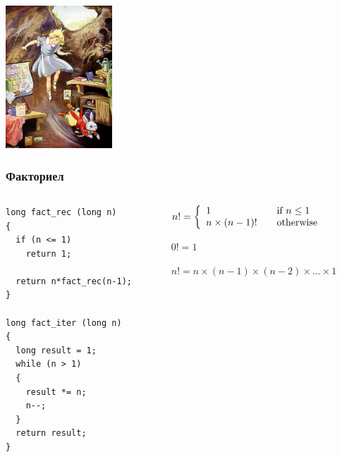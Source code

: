 \documentclass{beamer}
\begin{document}
\begin{frame}
\begin{center}
   \includegraphics[width=4cm]{images/hole}
\end{center}

\end{frame}



\begin{frame}[fragile]
\frametitle{Факториел}


\begin{columns}[t]
  \begin{column}{0.55\textwidth}

\begin{lstlisting}
long fact_rec (long n)
{
  if (n <= 1)
    return 1;

  return n*fact_rec(n-1);
}

long fact_iter (long n)
{
  long result = 1;
  while (n > 1)
  {
    result *= n;
    n--;
  }
  return result;
}

\end{lstlisting}


  \end{column}
  \begin{column}{0.45\textwidth}
\begin{flushleft}
  $n! = \left\{ 
        \begin{array}{l l}
          1 & \quad \text{if $n \leq 1$ }\\
    n \times (n-1)! & \quad \text{otherwise}
  \end{array} \right.$

  \vspace{10px}

  $0! = 1$

  $n! = n \times (n-1) \times (n-2) \times ... \times 1$

  
\end{flushleft}
  \end{column}
\end{columns}

\end{frame}
\end{document}
